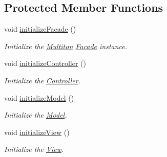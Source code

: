\subsection*{Protected Member Functions}
\begin{DoxyCompactItemize}
\item 
void \hyperlink{class_pure_m_v_c_1_1_facade_a9b3baa74217ad2b58a66b36f46c899f3}{initializeFacade} ()
\begin{DoxyCompactList}\small\item\em Initialize the \hyperlink{class_pure_m_v_c_1_1_multiton}{Multiton} {\ttfamily \hyperlink{class_pure_m_v_c_1_1_facade}{Facade}} instance. \item\end{DoxyCompactList}\item 
void \hyperlink{class_pure_m_v_c_1_1_facade_a90a6aaf2e117d6be41977192c5d169fc}{initializeController} ()
\begin{DoxyCompactList}\small\item\em Initialize the {\ttfamily \hyperlink{class_pure_m_v_c_1_1_controller}{Controller}}. \item\end{DoxyCompactList}\item 
void \hyperlink{class_pure_m_v_c_1_1_facade_aa9d0e1781ad74fd5fb7fd19f473514fb}{initializeModel} ()
\begin{DoxyCompactList}\small\item\em Initialize the {\ttfamily \hyperlink{class_pure_m_v_c_1_1_model}{Model}}. \item\end{DoxyCompactList}\item 
void \hyperlink{class_pure_m_v_c_1_1_facade_a62c7ff60891c00e2271a9ab5ab3640ab}{initializeView} ()
\begin{DoxyCompactList}\small\item\em Initialize the {\ttfamily \hyperlink{class_pure_m_v_c_1_1_view}{View}}. \item\end{DoxyCompactList}\end{DoxyCompactItemize}
